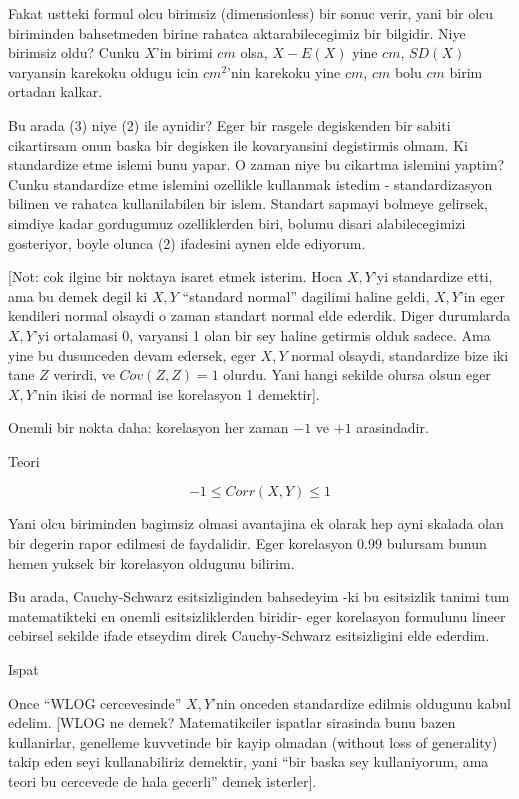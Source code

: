 \documentclass[12pt,fleqn]{article}\usepackage{../common}
\begin{document}
Fakat ustteki formul olcu birimsiz (dimensionless) bir sonuc verir, yani
bir olcu biriminden bahsetmeden birine rahatca aktarabilecegimiz bir
bilgidir. Niye birimsiz oldu? Cunku $X$'in birimi $cm$ olsa, $X-E(X)$ yine
$cm$, $SD(X)$ varyansin karekoku oldugu icin $cm^2$'nin karekoku yine $cm$,
$cm$ bolu $cm$ birim ortadan kalkar.

Bu arada (3) niye (2) ile aynidir? Eger bir rasgele degiskenden bir sabiti
cikartirsam onun baska bir degisken ile kovaryansini degistirmis olmam. Ki
standardize etme islemi bunu yapar. O zaman niye bu cikartma islemini
yaptim? Cunku standardize etme islemini ozellikle kullanmak istedim -
standardizasyon bilinen ve rahatca kullanilabilen bir islem. Standart
sapmayi bolmeye gelirsek, simdiye kadar gordugumuz ozelliklerden biri,
bolumu disari alabilecegimizi gosteriyor, boyle olunca (2) ifadesini aynen
elde ediyorum. 

[Not: cok ilginc bir noktaya isaret etmek isterim. Hoca $X,Y$'yi
standardize etti, ama bu demek degil ki $X,Y$ ``standard normal'' dagilimi
haline geldi, $X,Y$'in eger kendileri normal olsaydi o zaman standart
normal elde ederdik. Diger durumlarda $X,Y$'yi ortalamasi 0, varyansi 1
olan bir sey haline getirmis olduk sadece. Ama yine bu dusunceden devam
edersek, eger $X,Y$ normal olsaydi, standardize bize iki tane $Z$ verirdi,
ve $Cov(Z,Z)=1$ olurdu. Yani hangi sekilde olursa olsun eger $X,Y$'nin
ikisi de normal ise korelasyon 1 demektir].

Onemli bir nokta daha: korelasyon her zaman $-1$ ve $+1$ arasindadir. 

Teori

$$ -1 \le Corr(X,Y) \le 1 $$

Yani olcu biriminden bagimsiz olmasi avantajina ek olarak hep ayni skalada
olan bir degerin rapor edilmesi de faydalidir. Eger korelasyon 0.99
bulursam bunun hemen yuksek bir korelasyon oldugunu bilirim. 

Bu arada, Cauchy-Schwarz esitsizliginden bahsedeyim -ki bu esitsizlik
tanimi tum matematikteki en onemli esitsizliklerden biridir- eger
korelasyon formulunu lineer cebirsel sekilde ifade etseydim direk
Cauchy-Schwarz esitsizligini elde ederdim. 

Ispat

Once ``WLOG cercevesinde'' $X,Y$'nin onceden standardize edilmis oldugunu
kabul edelim. [WLOG ne demek? Matematikciler ispatlar sirasinda bunu bazen
kullanirlar, genelleme kuvvetinde bir kayip olmadan (without loss of
generality) takip eden seyi kullanabiliriz demektir, yani ``bir baska sey
kullaniyorum, ama teori bu cercevede de hala gecerli'' demek isterler]. 
\end{document}
